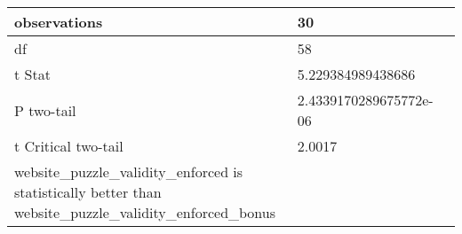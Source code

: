 \documentclass[11pt]{article}
\begin{document}
\begin{table}[]
{\begin{tabular}{|l|l|l|}
    observations                                                                                                & 30                                  &                                            \\ \hline
    df                                                                                                          & 58                                  &                                            \\ \hline
    t Stat                                                                                                      & 5.229384989438686                   &                                            \\ \hline
    P two-tail                                                                                                  & 2.4339170289675772e-06              &                                            \\ \hline
    t Critical two-tail                                                                                         & 2.0017                              &                                            \\ \hline
    website\_puzzle\_validity\_enforced is statistically better than website\_puzzle\_validity\_enforced\_bonus &                                     &                                            \\ \hline
    \end{tabular}%
    }
\end{table}
\end{document}
